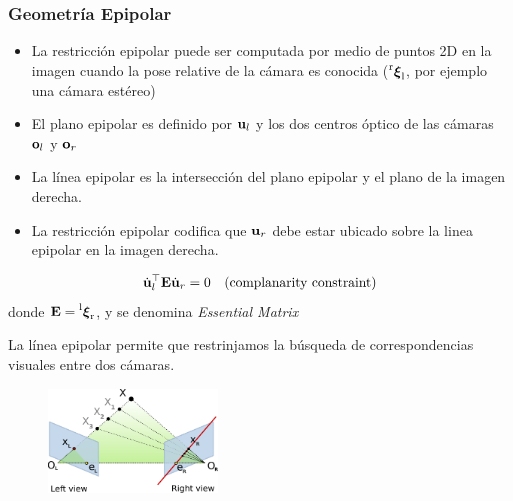 \begin{frame}
	\frametitle{Geometría Epipolar}
	\footnotesize
	
	\begin{itemize}
		\item La restricción epipolar puede ser computada por medio de puntos 2D en la imagen cuando la pose relative de la cámara es conocida ($\prescript{\mathrm{r}}{}{{\boldsymbol{\mathbf{\xi}}}_\mathrm{l}}$, por ejemplo una cámara estéreo)
		\item El plano epipolar es definido por $\boldsymbol{\mathbf{u}}_{l}$ y los dos centros óptico de las cámaras $\boldsymbol{\mathbf{o}}_{l}$ y $\boldsymbol{\mathbf{o}}_{r}$
		\item La línea epipolar es la intersección del plano epipolar y el plano de la imagen derecha.
		\item La restricción epipolar codifica que $\boldsymbol{\mathbf{u}}_{r}$ debe estar ubicado sobre la linea epipolar en la imagen derecha.
	\end{itemize}

	\begin{equation*}
		\dot{\boldsymbol{\mathbf{u}}}_{l}^{\top} \boldsymbol{\mathbf{E}} \dot{\boldsymbol{\mathbf{u}}}_{r} = 0 \quad \text{(complanarity constraint)}
	\end{equation*}
	donde $\boldsymbol{\mathbf{E}} = \prescript{\mathrm{l}}{}{{\boldsymbol{\mathbf{\xi}}}_\mathrm{r}}$, y se denomina \emph{Essential Matrix}
	
	La línea epipolar permite que restrinjamos la búsqueda de correspondencias visuales entre dos cámaras.
	
	
	\begin{figure}
		\includegraphics[width=0.4\textwidth]{./images/epipolar_geometry.pdf}
	\end{figure}
	
\end{frame}

